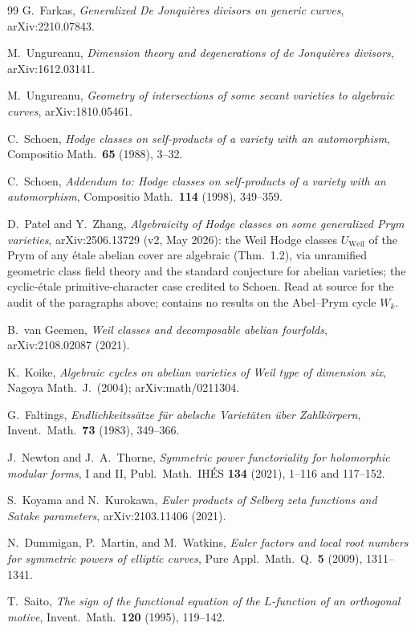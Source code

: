 \documentclass[11pt]{article}
\theoremstyle{definition}
\theoremstyle{remark}
\begin{document}
\begin{thebibliography}{99}
 G.~Farkas, \emph{Generalized De Jonqui\`eres divisors on
generic curves}, arXiv:2210.07843.

 M.~Ungureanu, \emph{Dimension theory and
degenerations of de Jonqui\`eres divisors}, arXiv:1612.03141.

 M.~Ungureanu, \emph{Geometry of intersections of
some secant varieties to algebraic curves}, arXiv:1810.05461.

 C.~Schoen, \emph{Hodge classes on self-products of a
variety with an automorphism}, Compositio Math.\ \textbf{65} (1988),
3--32.

 C.~Schoen, \emph{Addendum to: Hodge classes on
self-products of a variety with an automorphism}, Compositio Math.\
\textbf{114} (1998), 349--359.

 D.~Patel and Y.~Zhang, \emph{Algebraicity of Hodge
classes on some generalized Prym varieties}, arXiv:2506.13729 (v2, May
2026): the Weil Hodge classes $U_{\mathrm{Weil}}$ of the Prym of any
\'etale abelian cover are algebraic (Thm.~1.2), via unramified geometric
class field theory and the standard conjecture for abelian varieties;
the cyclic-\'etale primitive-character case credited to Schoen. Read at
source for the audit of the paragraphs above; contains no results on the
Abel--Prym cycle $W_k$.

 B.~van Geemen, \emph{Weil classes and decomposable
abelian fourfolds}, arXiv:2108.02087 (2021).

 K.~Koike, \emph{Algebraic cycles on abelian varieties of
Weil type of dimension six}, Nagoya Math.\ J.\ (2004);
arXiv:math/0211304.

 G.~Faltings, \emph{Endlichkeitss\"atze f\"ur abelsche
Variet\"aten \"uber Zahlk\"orpern}, Invent.\ Math.\ \textbf{73} (1983),
349--366.

 J.~Newton and J.~A.~Thorne, \emph{Symmetric power
functoriality for holomorphic modular forms}, I and II, Publ.\ Math.\
IH\'ES \textbf{134} (2021), 1--116 and 117--152.

 S.~Koyama and N.~Kurokawa, \emph{Euler products of
Selberg zeta functions and Satake parameters}, arXiv:2103.11406 (2021).

\bibitem{DMW} N.~Dummigan, P.~Martin, and M.~Watkins, \emph{Euler factors
and local root numbers for symmetric powers of elliptic curves}, Pure Appl.\
Math.\ Q.\ \textbf{5} (2009), 1311--1341.

\bibitem{SaitoEps} T.~Saito, \emph{The sign of the functional equation of
the $L$-function of an orthogonal motive}, Invent.\ Math.\ \textbf{120}
(1995), 119--142.

\end{thebibliography}
\end{document}
